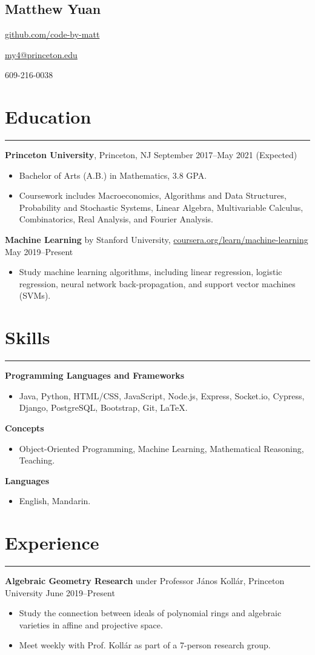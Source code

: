 \documentclass[10pt]{article}
\newcommand{\name}[1]{\begin{center}\section*{\huge #1}\end{center}}
\newcommand{\topinfo}[1]{\begin{center}\vspace{-0.2cm}#1\vspace{-0.2cm}\end{center}}
\newcommand{\resumesection}[1]{\vspace{-0.2cm}\section*{#1}\vspace{-0.2cm}\hrule\vspace{0.2cm}}
\begin{document}
\name{Matthew Yuan}
\topinfo{\href{https://github.com/code-by-matt}{github.com/code-by-matt}}
\topinfo{\href{mailto:my4@princeton.edu}{my4@princeton.edu}}
\topinfo{609-216-0038}

\resumesection{Education}

\textbf{Princeton University}, Princeton, NJ \hfill September 2017--May 2021 (Expected)
\begin{itemize}
	\item Bachelor of Arts (A.B.) in Mathematics, 3.8 GPA.
	\item Coursework includes Macroeconomics, Algorithms and Data Structures, Probability and Stochastic Systems, Linear Algebra, Multivariable Calculus, Combinatorics, Real Analysis, and Fourier Analysis.
\end{itemize}

\textbf{Machine Learning} by Stanford University, \href{https://www.coursera.org/learn/machine-learning}{coursera.org/learn/machine-learning} \hfill May 2019--Present
\begin{itemize}
	\item Study machine learning algorithms, including linear regression, logistic regression, neural network back-propagation, and support vector machines (SVMs).
\end{itemize}

\resumesection{Skills}

\textbf{Programming Languages and Frameworks}
\begin{itemize}
	\item Java, Python, HTML/CSS, JavaScript, Node.js, Express, Socket.io, Cypress, Django, PostgreSQL, Bootstrap, Git, \LaTeX.
\end{itemize}

\textbf{Concepts}
\begin{itemize}
	\item Object-Oriented Programming, Machine Learning, Mathematical Reasoning, Teaching.
\end{itemize}

\textbf{Languages}
\begin{itemize}
	\item English, Mandarin.
\end{itemize}

\resumesection{Experience}

\textbf{Algebraic Geometry Research} under Professor J\'{a}nos Koll\'{a}r, Princeton University \hfill June 2019--Present
\begin{itemize}
	\item Study the connection between ideals of polynomial rings and algebraic varieties in affine and projective space.
	\item Meet weekly with Prof. Koll\'{a}r as part of a 7-person research group.
\end{itemize}
\end{document}
